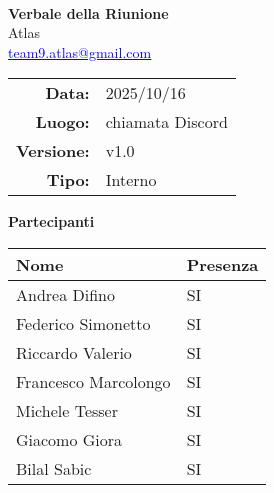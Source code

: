 \documentclass[a4paper,12pt]{article}
\makeatletter
\newcommand{\Gruppo}{Atlas}
\newcommand{\Email}{\href{mailto:team9.atlas@gmail.com}{\textcolor{blue}{\underline{team9.atlas@gmail.com}}}}
\newcommand{\TitoloVerbale}{Verbale della Riunione}
\newcommand{\DataVerbale}{2025/10/16}
\newcommand{\LuogoVerbale}{chiamata Discord}
\newcommand{\LogoGruppo}{img/AtlasLogo.png} %
\newcommand{\VersioneVerbale}{v1.0} %
\newcommand{\VerbaleInterno}{Interno}
\makeatother
\begin{document}
\begin{titlepage}
    \centering

    \vspace*{0cm}
    \\
    [.5cm]
    {\Huge \textbf{\TitoloVerbale}}\\[0.8cm]
    {\LARGE \Gruppo}\\[0.1cm]
    {\Email}\\[1.2cm]

    \begin{tabular}{rl}
        \textbf{Data:} & \DataVerbale \\
        \textbf{Luogo:} & \LuogoVerbale \\
        \textbf{Versione:} & \VersioneVerbale \\
        \textbf{Tipo:} & \VerbaleInterno \\
    \end{tabular}

    \vspace{1.2cm}

    {\large \textbf{Partecipanti}}\\[0.5cm]
    \begin{tabular}{l|l}
        \textbf{Nome} & \textbf{Presenza} \\
        \hline
        Andrea Difino & SI \\
        Federico Simonetto & SI \\
        Riccardo Valerio & SI \\
        Francesco Marcolongo & SI \\
        Michele Tesser & SI \\
        Giacomo Giora & SI \\
        Bilal Sabic & SI \\
    \end{tabular}

\end{titlepage}
\end{document}
